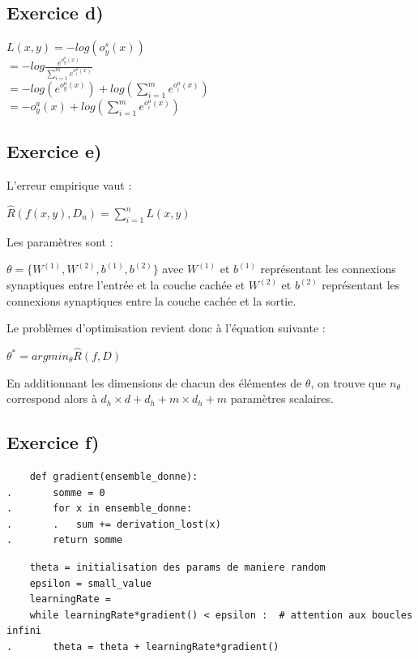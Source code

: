 \documentclass[a4paper,10pt]{article}
\begin{document}
\subsection{Exercice d)}

$ L(x,y) = -log  (o^{s}_{y}(x)) $
\\[6pt]
$= -log \frac{e^{o^{a}_{y}(x)}}{\sum_{i=1}^{m} e^{o^{a}_{i}(x)}}$ 
\\[6pt]
$= -log(e^{o^{a}_{y}(x)}) +log(\sum_{i=1}^{m} e^{o^{a}_{i}(x)})  $
\\[6pt]
$ = -o^{a}_{y}(x) + log(\sum_{i=1}^{m} e^{o^{a}_{i}(x)})$

\subsection{Exercice e)} 

L'erreur empirique vaut :

$\widehat{R}(f(x,y),D_{n}) = \sum_{i=1}^{n} L(x,y)$


Les paramètres sont :

$ \theta = \{ W^{(1)},W^{(2)},b^{(1)},b^{(2)} \}$ avec $W^{(1)}$ et $b^{(1)}$ représentant les connexions synaptiques entre l'entrée et la couche cachée et $W^{(2)}$ et $b^{(2)}$ représentant les connexions synaptiques entre la couche cachée et la sortie.

Le problèmes d'optimisation revient donc à l'équation suivante :

$\theta^{*} = argmin_{\theta} \widehat{R}(f,D) $

En additionnant les dimensions de chacun des élémentes de $\theta$, on trouve que $n_{\theta}$ correspond alors à $d_{h} \times d + d_{h} + m \times d_{h} + m$ paramètres scalaires.

\subsection{Exercice f)} 

\begin{verbatim}
	def gradient(ensemble_donne):
.		somme = 0
.		for x in ensemble_donne:
.		.	sum += derivation_lost(x)
.		return somme
\end{verbatim}

\begin{verbatim}
	theta = initialisation des params de maniere random	
	epsilon = small_value
	learningRate =
	while learningRate*gradient() < epsilon :  # attention aux boucles infini
.		theta = theta + learningRate*gradient()
\end{verbatim}
\end{document}
